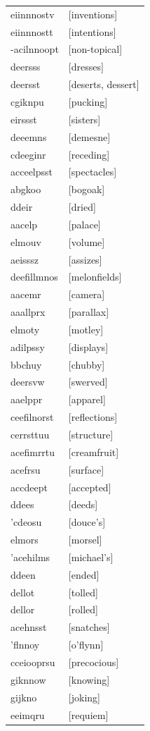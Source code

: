 \documentclass{article}
\begin{document}
\begin{tabular}{ll}
eiinnnostv & [inventions] \\
eiinnnostt & [intentions] \\
-acilnnoopt & [non-topical] \\
deersss & [dresses] \\
deersst & [deserts, dessert] \\
cgiknpu & [pucking] \\
eirssst & [sisters] \\
deeemns & [demesne] \\
cdeeginr & [receding] \\
acceelpsst & [spectacles] \\
abgkoo & [bogoak] \\
ddeir & [dried] \\
aacelp & [palace] \\
elmouv & [volume] \\
aeisssz & [assizes] \\
deefillmnos & [melonfields] \\
aacemr & [camera] \\
aaallprx & [parallax] \\
elmoty & [motley] \\
adilpssy & [displays] \\
bbchuy & [chubby] \\
deersvw & [swerved] \\
aaelppr & [apparel] \\
ceefilnorst & [reflections] \\
cerrsttuu & [structure] \\
acefimrrtu & [creamfruit] \\
acefrsu & [surface] \\
accdeept & [accepted] \\
ddees & [deeds] \\
'cdeosu & [douce's] \\
elmors & [morsel] \\
'acehilms & [michael's] \\
ddeen & [ended] \\
dellot & [tolled] \\
dellor & [rolled] \\
acehnsst & [snatches] \\
'flnnoy & [o'flynn] \\
cceiooprsu & [precocious] \\
giknnow & [knowing] \\
gijkno & [joking] \\
eeimqru & [requiem] \\

\end{tabular}
\end{document}

